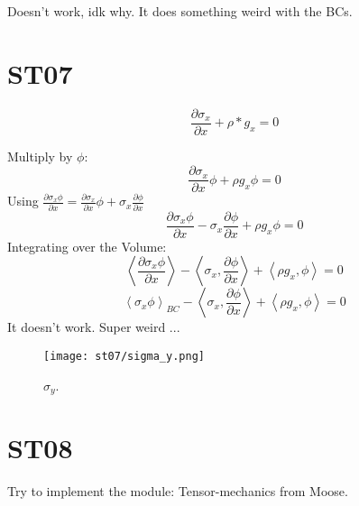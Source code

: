\documentclass[11pt,letterpaper]{article}
\begin{document}
Doesn't work, idk why. It does something weird with the BCs.

\section{ST07}

\begin{equation}
\frac{\partial \sigma_x}{\partial x} + \rho * g_x = 0
\end{equation}

Multiply by $\phi$:
\begin{equation}
\frac{\partial \sigma_x}{\partial x} \phi + \rho g_x \phi = 0
\end{equation}
Using $\frac{\partial \sigma_x \phi}{\partial x}=\frac{\partial \sigma_x}{\partial x} \phi + \sigma_x \frac{\partial \phi}{\partial x}$
\begin{equation}
\frac{\partial \sigma_x \phi}{\partial x} - \sigma_x \frac{\partial \phi}{\partial x} + \rho g_x \phi = 0
\end{equation}
Integrating over the Volume:
\begin{equation}
\left< \frac{\partial \sigma_x \phi}{\partial x} \right> - \left< \sigma_x,\frac{\partial \phi}{\partial x} \right> + \left< \rho g_x,\phi \right> = 0
\end{equation}
\begin{equation}
\left< \sigma_x \phi \right>_{BC} - \left< \sigma_x,\frac{\partial \phi}{\partial x} \right> + \left< \rho g_x,\phi \right> = 0
\end{equation}
It doesn't work. Super weird ...

\begin{figure}[H]
	\centering
	\texttt{[image: st07/sigma\_y.png]}
	\hfill
	\caption{$\sigma_y$.}
	\label{fig:st07}
\end{figure}

\section{ST08}

Try to implement the module: Tensor-mechanics from Moose.

\pagebreak 


\end{document}
